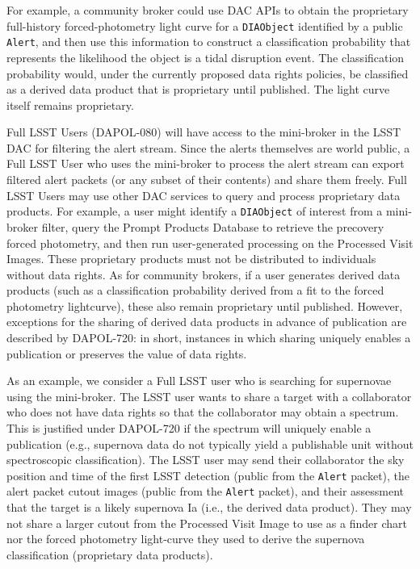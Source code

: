 For example, a community broker could use DAC APIs to obtain the proprietary full-history forced-photometry light curve for a \texttt{DIAObject} identified by a public {\tt Alert}, 
and then use this information to construct a classification probability that represents the likelihood the object is a tidal disruption event.
The classification probability would, under the currently proposed data rights policies, be classified as a derived data product that is proprietary until published. The light curve itself remains proprietary.


Full LSST Users (DAPOL-080) will have access to the mini-broker in the LSST DAC for filtering the alert stream.
Since the alerts themselves are world public, a Full LSST User who uses the mini-broker to process the alert stream can export filtered alert packets (or any subset of their contents) and share them freely.
Full LSST Users may use other DAC services to query and process proprietary data products. 
For example, a user might identify a \texttt{DIAObject} of interest from a mini-broker filter, query the Prompt Products Database to retrieve the precovery forced photometry, and then run user-generated processing on the Processed Visit Images.
These proprietary products must not be distributed to individuals without data rights.
As for community brokers, if a user generates derived data products (such as a classification probability derived from a fit to the forced photometry lightcurve), these also remain proprietary until published. However, exceptions for the sharing of derived data products in advance of publication are described by DAPOL-720: in short, instances in which sharing uniquely enables a publication or preserves the value of data rights.

As an example, we consider a Full LSST user who is searching for supernovae using the mini-broker.
The LSST user wants to share a target with a collaborator who does not have data rights so that the collaborator may obtain a spectrum. This is justified under DAPOL-720 if the spectrum will uniquely enable a publication (e.g., supernova data do not typically yield a publishable unit without spectroscopic classification). The LSST user may send their collaborator the sky position and time of the first LSST detection (public from the \texttt{Alert} packet), the alert packet cutout images (public from the \texttt{Alert} packet), and their assessment that the target is a likely supernova Ia (i.e., the derived data product). They may not share a larger cutout from the Processed Visit Image to use as a finder chart nor the forced photometry light-curve they used to derive the supernova classification (proprietary data products). 
